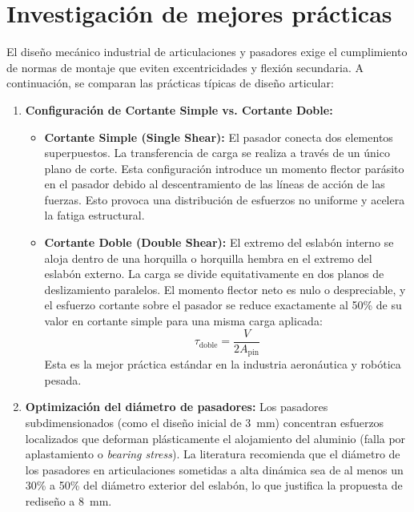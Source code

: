 \documentclass[11pt,a4paper]{article}
\begin{document}
\section{Investigación de mejores prácticas}
El diseño mecánico industrial de articulaciones y pasadores exige el cumplimiento de normas de montaje que eviten excentricidades y flexión secundaria. A continuación, se comparan las prácticas típicas de diseño articular:
\begin{enumerate}
    \item \textbf{Configuración de Cortante Simple vs. Cortante Doble:}
    \begin{itemize}
        \item \textbf{Cortante Simple (Single Shear):} El pasador conecta dos elementos superpuestos. La transferencia de carga se realiza a través de un único plano de corte. Esta configuración introduce un momento flector parásito en el pasador debido al descentramiento de las líneas de acción de las fuerzas. Esto provoca una distribución de esfuerzos no uniforme y acelera la fatiga estructural.
        \item \textbf{Cortante Doble (Double Shear):} El extremo del eslabón interno se aloja dentro de una horquilla o horquilla hembra en el extremo del eslabón externo. La carga se divide equitativamente en dos planos de deslizamiento paralelos. El momento flector neto es nulo o despreciable, y el esfuerzo cortante sobre el pasador se reduce exactamente al 50\% de su valor en cortante simple para una misma carga aplicada:
        $$\tau_{\text{doble}} = \frac{V}{2 A_{\text{pin}}}$$
        Esta es la mejor práctica estándar en la industria aeronáutica y robótica pesada.
    \end{itemize}
    \item \textbf{Optimización del diámetro de pasadores:}
    Los pasadores subdimensionados (como el diseño inicial de 3~mm) concentran esfuerzos localizados que deforman plásticamente el alojamiento del aluminio (falla por aplastamiento o \textit{bearing stress}). La literatura recomienda que el diámetro de los pasadores en articulaciones sometidas a alta dinámica sea de al menos un 30\% a 50\% del diámetro exterior del eslabón, lo que justifica la propuesta de rediseño a 8~mm.
\end{enumerate}
\end{document}
